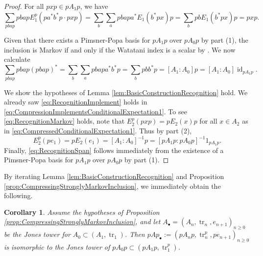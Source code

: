 \documentclass[11pt]{article}
\theoremstyle{plain}
\newtheorem{cor}[thm]{Corollary}
\theoremstyle{definition}
\DeclareMathOperator{\id}{id}
\DeclareMathOperator{\tr}{tr}
\begin{document}
\begin{proof}
\mbox{}
\item[\underline{Proof of (1):}]
For all $pxp \in pA_1p$, we have
$$
\sum_{pbap} 
pbap
E^p_1(pa^*b^*p \cdot pxp)
=
\sum_b
\sum_a
pbapa^* E_1(b^*px)p
=
\sum_b pbE_1(b^*px)p
=
pxp.
$$

\item[\underline{Proof of (2):}]
Given that there exists a Pimsner-Popa basis for $pA_1p$ over $pA_0p$ by part (1), the inclusion is Markov if and only if the Watatani index \cite{MR996807} is a scalar by \cite[1.1.4(c)]{MR1278111}.
We now calculate
$$
\sum_{pbap} pbap(pbap)^*
=
\sum_b\sum_a pbapa^*b^*p
=
\sum_b pbb^*p
=
[A_1:A_0] p
=
[A_1:A_0] \id_{pA_1p}.
$$

\item[\underline{Proof of (3):}]
We show the hypotheses of Lemma \ref{lem:BasicConstructionRecognition} hold.
We already saw \ref{eq:RecognitionImplement} holds in \eqref{eq:CompressionImplementsConditionalExpectation1}.
To see \ref{eq:RecognitionMarkov} holds, note that $E^p_2(pxp) = pE_2(x)p$ for all $x\in A_2$ as in  \eqref{eq:CompressedConditionalExpectation1}.
Thus by part (2),
$$
E^{p}_{2}(pe_1) 
= 
pE_2(e_1) 
= 
[A_1:A_0]^{-1}p 
= 
[pA_1p:pA_0p]^{-1} 1_{pA_1p}.
$$
Finally, \ref{eq:RecognitionSpan} follows immediately from the existence of a Pimsner-Popa basis for $pA_1p$ over $pA_0p$ by part (1).
\end{proof}

By iterating Lemma \ref{lem:BasicConstructionRecognition} and Proposition \ref{prop:CompressingStronglyMarkovInclusion}, we immediately obtain the following.

\begin{cor}
\label{cor:CompressJonesTower}
Assume the hypotheses of Proposition \ref{prop:CompressingStronglyMarkovInclusion}, and let $A_\bullet=(A_n, \tr_n, e_{n+1})_{n\geq 0}$ be the Jones tower for $A_0 \subset (A_1, \tr_1)$.
Then $pAp_\bullet:=(pA_np, \tr_n^p, pe_{n+1})_{n\geq 0}$ is isomorphic to the Jones tower of $pA_0p \subset (pA_1p, \tr_1^p)$.
\end{cor}
\end{document}
